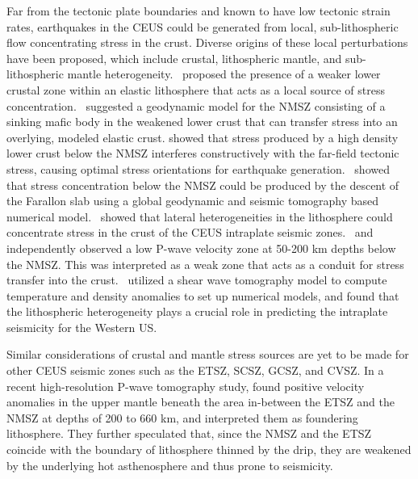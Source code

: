 \documentclass[draft,linenumbers]{agujournal2018}
\begin{document}
    Far from the tectonic plate boundaries and known to have low tectonic strain rates, earthquakes in the CEUS could be generated from local, sub-lithospheric flow concentrating stress in the crust. Diverse origins of these local perturbations have been proposed, which include crustal, lithospheric mantle, and sub-lithospheric mantle heterogeneity.~\citet{Kenner_2000a} proposed the presence of a weaker lower crustal zone within an elastic lithosphere that acts as a local source of stress concentration.~\citet{Pollitz_2001} suggested a geodynamic model for the NMSZ consisting of a sinking mafic body in the weakened lower crust that can transfer stress into an overlying, modeled elastic crust. \citet{levandowski2016dense} showed that stress produced by a high density lower crust below the NMSZ interferes constructively with the far-field tectonic stress, causing optimal stress orientations for earthquake generation.~\citet{forte2007descent} showed that stress concentration below the NMSZ could be produced by the descent of the Farallon slab using a global geodynamic and seismic tomography based numerical model.~\citet{li2007stress} showed that lateral heterogeneities in the lithosphere could concentrate stress in the crust of the CEUS intraplate seismic zones.~\citet{chen2014crust} and~\citet{nyamwandha2016joint} independently observed a low P-wave velocity zone at 50-200 km depths below the NMSZ. This was interpreted as a weak zone that acts as a conduit for stress transfer into the crust.~\citet{becker2015western}  utilized a shear wave tomography model to compute temperature and density anomalies to set up numerical models, and found that the lithospheric heterogeneity plays a crucial role in predicting the intraplate seismicity for the Western US.
    
Similar considerations of crustal and mantle stress sources are yet to be made for other CEUS seismic zones such as the ETSZ, SCSZ, GCSZ, and CVSZ. In a recent high-resolution P-wave tomography study, \citet{Biryol_2016} found positive velocity anomalies in the upper mantle beneath the area in-between the ETSZ and the NMSZ at depths of 200 to 660 km, and interpreted them as foundering lithosphere. They further speculated that, since the NMSZ and the ETSZ coincide with the boundary of lithosphere thinned by the drip, they are weakened by the underlying hot asthenosphere and thus prone to seismicity. 
\end{document}
